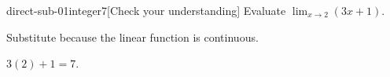 \begin{bgcheck}{direct-sub-01}{integer}{7}[Check your understanding]
Evaluate \(\lim_{x\to2}(3x+1)\).
\begin{bghint}
Substitute because the linear function is continuous.
\end{bghint}
\begin{bgreveal}
\(3(2)+1=7\).
\end{bgreveal}
\end{bgcheck}
